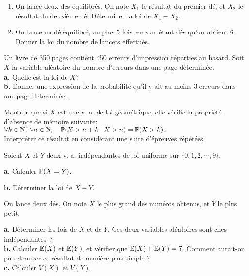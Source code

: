 





\begin{exo}
\begin{enumerate}
\item On lance deux dés équilibrés. On note $X_1$ le résultat du premier dé, et $X_2$ le résultat du deuxième dé. Déterminer la loi de $X_1-X_2$.
\item On lance un dé équilibré, au plus $5$ fois, en s'arrêtant dès qu'on obtient $6$. Donner la loi du nombre de lancers effectués.
\end{enumerate}
\end{exo}


\begin{exo}
Un livre de 350 pages contient 450 erreurs d'impression réparties au hasard. Soit $X$
la variable aléatoire du nombre d'erreurs dans une page déterminée.
\\
\textbf{a.} Quelle est la loi de $X$?
\\
\textbf{b.} Donner une expression de la probabilité qu'il y ait au moins 3 erreurs dans
      une page déterminée.
\end{exo}


\begin{exo}
Montrer que si $X$ est une v. a. de loi géométrique, elle vérifie 
la propriété d'absence de mémoire suivante: $\forall k\in\N,\;\forall n\in\N,\quad \P(X>n+k\mid X>n)=\P(X>k).$\\
Interpréter ce résultat en considérant une suite d'épreuves répétées.
\end{exo}


\begin{exo} Soient $X$ et $Y$ deux v. a. indépendantes de loi uniforme sur $\{0,1,2,\cdots,9\}$.

\noindent\textbf{a.} Calculer $\P(X=Y)$.

\noindent\textbf{b.} Déterminer la loi de $X+Y$.
%
\end{exo}


\begin{exo} 
On lance deux dés. On note $X$ le plus grand des numéros obtenus, et $Y$
le plus petit.

\noindent
\textbf{a.} Déterminer les lois de $X$ et de $Y$. Ces deux variables aléatoires
sont-elles indépendantes~?\\
\noindent
\textbf{b.} Calculer $\E(X)$ et $\E(Y)$, et vérifier que $\E(X)+\E(Y)=7$. Comment aurait-on pu retrouver ce résultat de manière plus simple ?\\
\noindent
\textbf{c.} Calculer $V(X)$ et $V(Y)$.
\end{exo}


